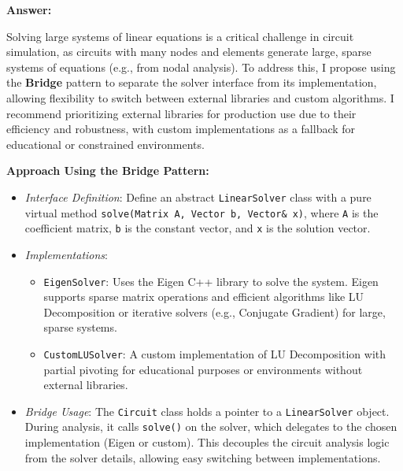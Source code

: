 \documentclass{article}
\begin{document}
\textbf{Answer:}

Solving large systems of linear equations is a critical challenge in circuit simulation, as circuits with many nodes and elements generate large, sparse systems of equations (e.g., from nodal analysis). To address this, I propose using the \textbf{Bridge} pattern to separate the solver interface from its implementation, allowing flexibility to switch between external libraries and custom algorithms. I recommend prioritizing external libraries for production use due to their efficiency and robustness, with custom implementations as a fallback for educational or constrained environments.

\textbf{Approach Using the Bridge Pattern:}
\begin{itemize}
    \item \textit{Interface Definition}: Define an abstract \texttt{LinearSolver} class with a pure virtual method \texttt{solve(Matrix A, Vector b, Vector\& x)}, where \texttt{A} is the coefficient matrix, \texttt{b} is the constant vector, and \texttt{x} is the solution vector.
    \item \textit{Implementations}:
    \begin{itemize}
        \item \texttt{EigenSolver}: Uses the Eigen C++ library to solve the system. Eigen supports sparse matrix operations and efficient algorithms like LU Decomposition or iterative solvers (e.g., Conjugate Gradient) for large, sparse systems.
        \item \texttt{CustomLUSolver}: A custom implementation of LU Decomposition with partial pivoting for educational purposes or environments without external libraries.
    \end{itemize}
    \item \textit{Bridge Usage}: The \texttt{Circuit} class holds a pointer to a \texttt{LinearSolver} object. During analysis, it calls \texttt{solve()} on the solver, which delegates to the chosen implementation (Eigen or custom). This decouples the circuit analysis logic from the solver details, allowing easy switching between implementations.
\end{itemize}
\end{document}

